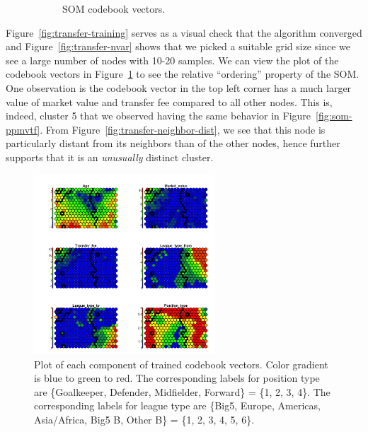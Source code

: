 \begin{figure}[t]
\begin{subfigure}[b]{0.45\textwidth}
        \caption{SOM codebook vectors.}
        \label{fig:transfer-codebooks}
    \end{subfigure}
    \caption{}
    \label{fig:transferplots}
\end{figure}

Figure~\ref{fig:transfer-training} serves as a visual check 
that the algorithm converged and 
Figure~\ref{fig:transfer-nvar} shows that we picked a suitable grid size
since we see a large number of nodes with 10-20 samples.
We can view the plot of the codebook vectors in Figure~\ref{fig:transfer-codebooks} 
to see the relative ``ordering'' property of the SOM. 
One observation is the codebook vector in the top left corner 
has a much larger value of market value and transfer fee compared to all other nodes. 
This is, indeed, cluster 5 that we observed having the same behavior 
in Figure~\ref{fig:som-ppmvtf}.
From Figure~\ref{fig:transfer-neighbor-dist},
we see that this node is particularly distant from its neighbors than of the other nodes,
hence further supports that it is an \emph{unusually} distinct cluster.

\begin{figure}[t]
    \centering
    \includegraphics[width=0.6\textwidth]{../figs/transfer_feature_map.png}
    \caption{Plot of each component of trained codebook vectors. 
             Color gradient is blue to green to red. 
             The corresponding labels for position type are 
             \{Goalkeeper, Defender, Midfielder, Forward\} = \{1, 2, 3, 4\}. 
             The corresponding labels for league type are 
             \{Big5, Europe, Americas, Asia/Africa, Big5 B, Other B\} = 
             \{1, 2, 3, 4, 5, 6\}.}
    \label{fig:transfers-variable-plots}
\end{figure}

